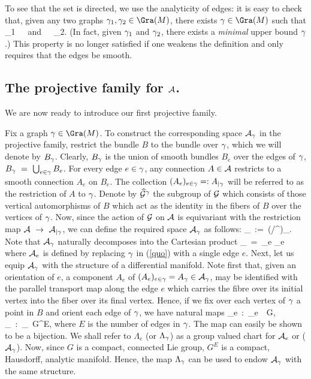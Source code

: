 To see that the set is directed, we use the analyticity of edges: it
is easy to check that, given any two graphs $\g_1, \g_2\in \Gra(\S)$,
there exists $\g\in \Gra(\S)$ such that
\be
\g\ge\g_1\ \ \ {\rm and}\ \ \ \g\ge\g_2.
\ee
(In fact, given $\gamma_1$ and $\gamma_2$, there exists a {\it minimal} upper
bound $\gamma$.)  This property is no longer satisfied if one weakens the
definition and only requires that the edges be smooth. 

\subsection{The projective family for ${\cal A}$.}

We are now ready to introduce our first projective family.

Fix a graph $\g\in\Gra(\S)$.  To construct the corresponding space
${\cal A}_\gamma$ in the projective family, restrict the bundle $B$ to the
bundle over $\gamma$, which we will denote by $B_{\gamma}$. Clearly, $B_{\gamma}$
is the union of smooth bundles $B_e$ over the edges of $\gamma$, $B_{\gamma}\
=\ \bigcup_{e\in\gamma} B_{e}$. For every edge $e\in \gamma$, any connection
$A\in{\cal A}$ restricts to a smooth connection $A_e$ on $B_e$. The
collection $(A_e)_{e\in\gamma} =: A_{|\gamma}$ will be referred to as the
restriction of $A$ to $\gamma$. Denote by $\widehat{{\cal G}}^\gamma$ the subgroup
of ${\cal G}$ which consists of those vertical automorphisms of $B$ which
act as the identity in the fibers of $B$ over the vertices of $\gamma$.
Now, since the action of ${\cal G}$ on ${\cal A}$ is equivariant with the
restriction map ${\cal A}\ \rightarrow\ {\cal A}_{|\gamma}$, we can define the
required space ${\cal A}_{\gamma}$ as follows:
\be\label{quo}
\A_\g\ :=\ (\A/\widehat{\G}^{\g})_{\g}.
\ee
Note that ${\cal A}_\gamma$ naturally decomposes into the Cartesian product
\be
\A_\g\ =\ \times_{e\in\g} \A_e
\ee
where ${\cal A}_e$ is defined by replacing $\gamma$ in (\ref{quo}) with a single
edge $e$. Next, let us equip ${\cal A}_\gamma$ with the structure of a
differential manifold.  Note first that, given an orientation of $e$,
a component $A_e$ of $(A_e)_{e\in \gamma}=A_\gamma\in{\cal A}_\gamma$, may be identified
with the parallel transport map along the edge $e$ which carries the
fibre over its initial vertex into the fiber over its final vertex.
Hence, if we fix over each vertex of $\gamma$ a point in $B$ and orient
each edge of $\gamma$, we have natural maps
\be \label{diff}
\Lambda_e\  :\ \A_e\ \rightarrow\ G, \quad 
\Lambda_\g\ :\ \A_\g \rightarrow\ G^E,
\ee
where $E$ is the number of edges in $\gamma$. The map can easily be shown
to be a bijection. We shall refer to $\Lambda_e$ (or $\Lambda_\gamma$) as a
group valued chart for ${\cal A}_e$ or (${\cal A}_\gamma$). Now, since $G$ is a
compact, connected Lie group, $G^E$ is a compact, Hausdorff, analytic
manifold.  Hence, the map $\Lambda_\gamma$ can be used to endow ${\cal A}_\gamma$
with the same structure.

